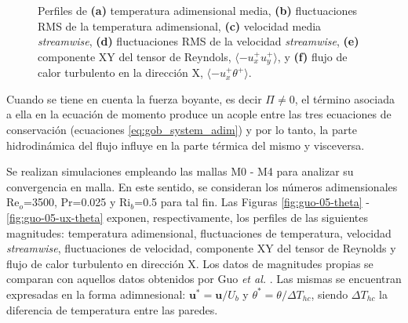 \begin{figure}[H]
 \caption{Perfiles de \textbf{(a)} temperatura adimensional media, \textbf{(b)} fluctuaciones RMS de la temperatura adimensional, \textbf{(c)} velocidad media \textit{streamwise}, \textbf{(d)} fluctuaciones RMS de la velocidad \textit{streamwise}, \textbf{(e)} componente XY del tensor de Reyndols, $\langle -u^+_x u^+_y \rangle$, y \textbf{(f)} flujo de calor turbulento en la dirección X, $\langle -u^+_x \theta^+ \rangle$.} 
 \label{fig:guo-05}
\end{figure}

Cuando se tiene en cuenta la fuerza boyante, es decir $\Pi \neq 0$, el término asociada a ella en la ecuación de momento produce un acople entre las tres ecuaciones de conservación (ecuaciones \ref{eq:gob_system_adim}) y por lo tanto, la parte hidrodinámica del flujo influye en la parte térmica del mismo y visceversa. 

Se realizan simulaciones empleando las mallas M0 - M4 para analizar su convergencia en malla. En este sentido, se consideran los números adimensionales Re$_o$=3500, Pr=0.025 y Ri$_b$=0.5 para tal fin. Las Figuras \ref{fig:guo-05-theta} - \ref{fig:guo-05-ux-theta} exponen, respectivamente, los perfiles de las siguientes magnitudes: temperatura adimensional, fluctuaciones de temperatura, velocidad \textit{streamwise}, fluctuaciones de velocidad, componente XY del tensor de Reynolds y flujo de calor turbulento en dirección X. Los datos de magnitudes propias se comparan con aquellos datos obtenidos por Guo \textit{et al.} \cite{guo2022direct}. Las mismas se encuentran expresadas en la forma adimnesional: $\mathbf{u^*} = \mathbf{u} / U_b$ y $\theta^* = \theta / \Delta T_{hc}$, siendo $\Delta T_{hc}$ la diferencia de temperatura entre las paredes.

